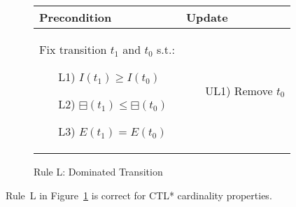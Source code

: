 \begin{figure}[h!]
    \vspace{5mm}
    \begin{adjustbox}{center}
        \begin{tabular}{|p{55mm}|p{45mm}|} \hline
        Precondition & Update \\ \hline
        Fix transition $t_1$ and $t_0$ s.t.:
        \begin{itemize}[leftmargin=10mm]
            \item[L1)] $I(t_1)\geq I(t_0)$
            \item[L2)] $\boxminus(t_1)\leq \boxminus(t_0)$
            \item[L3)] $E(t_1)=E(t_0)$
        \end{itemize}
        &
        \begin{itemize}[leftmargin=10mm]
            \item[UL1)] Remove $t_0$
        \end{itemize} \\ \hline
        \end{tabular}
    \end{adjustbox}
    \caption{Rule L: Dominated Transition}
    \label{fig:rule_l}
\end{figure}

\begin{theorem}
    Rule~L in Figure~\ref{fig:rule_l} is correct for CTL* cardinality properties.
\end{theorem}
